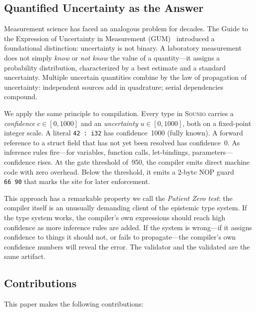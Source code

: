 \documentclass[acmsmall,screen,review,anonymous]{acmart}
\newcommand{\sounio}{\textsc{Sounio}\xspace}
\begin{document}
\subsection{Quantified Uncertainty as the Answer}

Measurement science has faced an analogous problem for decades.
The Guide to the Expression of Uncertainty in Measurement
(GUM)~\cite{jcgm2008gum} introduced a foundational distinction:
uncertainty is not binary.
A laboratory measurement does not simply \emph{know} or \emph{not know}
the value of a quantity---it assigns a probability distribution,
characterized by a best estimate and a standard uncertainty.
Multiple uncertain quantities combine by the law of propagation of
uncertainty: independent sources add in quadrature; serial dependencies
compound.

We apply the same principle to compilation.
Every type in \sounio carries a \emph{confidence} $c \in [0, 1000]$
and an \emph{uncertainty} $u \in [0, 1000]$, both on a fixed-point
integer scale.
A literal \texttt{42\,:\,i32} has confidence~1000 (fully known).
A forward reference to a struct field that has not yet been resolved
has confidence~0.
As inference rules fire---for variables, function calls, let-bindings,
parameters---confidence rises.
At the gate threshold of~950, the compiler emits direct machine code
with zero overhead.
Below the threshold, it emits a 2-byte NOP guard \texttt{66~90} that
marks the site for later enforcement.

This approach has a remarkable property we call the \emph{Patient Zero
test}: the compiler itself is an unusually demanding client of
the epistemic type system.
If the type system works, the compiler's own expressions should reach
high confidence as more inference rules are added.
If the system is wrong---if it assigns confidence to things it should
not, or fails to propagate---the compiler's own confidence numbers
will reveal the error.
The validator and the validated are the same artifact.

\subsection{Contributions}

This paper makes the following contributions:
\end{document}
